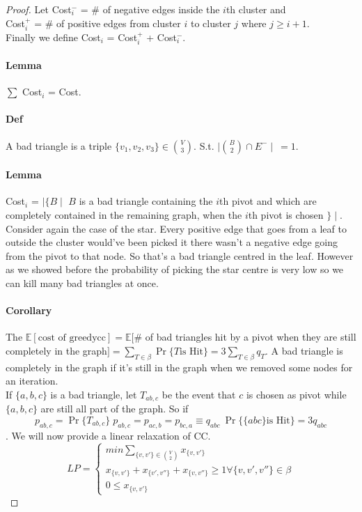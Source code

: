 \documentclass[]{article}
\begin{document}
\begin{proof}
	Let Cost$^-_i $ = \# of negative edges inside the $ i $th cluster and\\
	Cost$^+_i $ = \# of positive edges from cluster $ i $ to cluster $ j $ where $ j \geq i+1 $.\\ Finally we define Cost$_i $ = Cost$^+_i $ + Cost$^-_i $.
	\paragraph{Lemma} $ \sum  $  Cost$_i $ = Cost.\\
	\paragraph{Def} A bad triangle is a triple $ \{v_1, v_2, v_3 \} \in {V \choose 3}$. S.t. $ \mid {B \choose 2} \cap E^- \mid\ = 1$.
	\paragraph{Lemma} Cost$_i $ = $ \mid\{ B \mid $  $ B $ is a bad triangle containing the $ i $th pivot and which are completely contained in the remaining graph, when the $ i $th pivot is chosen $ \}\mid $.  Consider again the case of the star. Every positive edge that goes from a leaf to outside the cluster would've been picked it there wasn't a negative edge going from the pivot to that node. So that's a bad triangle centred in the leaf. However as we showed before the probability of picking the star centre is very low so we can kill many bad triangles at once.
	\paragraph{Corollary} The $ \mathbb{E} [\text{cost of greedycc}] = \mathbb{E}[$\# of bad triangles hit by a pivot when they are still completely in the graph$] = \sum\limits_{T \in \beta}\Pr\{T \text{is Hit}\} = 3\sum\limits_{T \in \beta} q_T$. A bad triangle is completely in the graph if it's still in the graph when we removed some nodes for an iteration.\\
	If $ \{a, b, c\} $ is a bad triangle, let $ T_{ab,c} $ be the event that $ c $ is chosen as pivot while $ \{a, b, c\} $ are still all part of the graph. So if \[
	p_{ab,c} = \Pr\{T_{ab,c}\}\; p_{ab,c}=p_{ac,b}=p_{bc,a} \equiv q_{abc}\ \Pr\{\{abc\} \text{is Hit}\} = 3q_{abc}\]. We will now provide a linear relaxation of CC.
	\[
	LP = 
	\begin{cases}
	min \sum_{\{v, v'\}\in {V\choose 2}}^{} x_{\{v, v'\}}\\
	x_{\{v, v'\}} + x_{\{v', v''\}} + x_{\{v, v''\}} \geq 1 \forall \{v, v', v''\}\in \beta \\
	0 \leq x_{\{v, v'\}}	
	\end{cases}
	\]
	

\end{proof}
\end{document}
